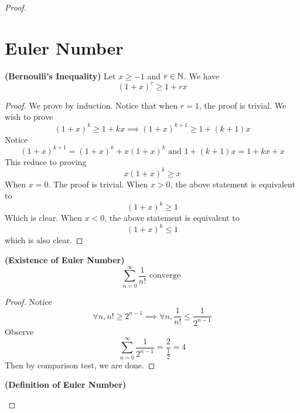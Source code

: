 \documentclass{report}
\begin{document}
\begin{proof}
\section{Euler Number}
\begin{lemma}
\label{2.4.1}
\textbf{(Bernoulli's Inequality)} 
Let $x\geq -1$ and $r\in\mathbb{N}$. We have
\begin{equation}
  (1+x)^r\geq 1+rx
\end{equation}
\end{lemma}
\begin{proof}
We prove by induction. Notice that when $r=1$, the proof is trivial. We wish to prove
\begin{equation}
  (1+x)^k \geq 1+kx\implies (1+x)^{k+1}\geq 1+(k+1)x
\end{equation}
Notice
\begin{equation}
  (1+x)^{k+1}=(1+x)^k +x(1+x)^k\text{ and }1+(k+1)x=1+kx+x
\end{equation}
This reduce to proving 
\begin{equation}
x(1+x)^k \geq x
\end{equation}
When $x=0$. The proof is trivial. When  $x>0$, the above statement is equivalent to 
 \begin{equation}
   (1+x)^k\geq 1
\end{equation}
Which is clear. When $x<0$, the above statement is equivalent to 
 \begin{equation}
   (1+x)^k\leq 1
\end{equation}
which is also clear.
\end{proof}
\begin{theorem}
\label{2.4.2}
\textbf{(Existence of Euler Number)} 
\begin{equation}
\sum_{n=0}^\infty \frac{1}{n!}\text{ converge }
\end{equation}
\end{theorem}
\begin{proof}
Notice 
\begin{equation}
\forall n, n!\geq 2^{n-1}\implies \forall n,\frac{1}{n!}\leq \frac{1}{2^{n-1}}
\end{equation}
Observe 
\begin{equation}
\sum_{n=0}^\infty  \frac{1}{2^{n-1}}=\frac{2}{\frac{1}{2}}=4
\end{equation}
Then by comparison test, we are done. 
\end{proof}
\begin{definition}
\label{2.4.3}
\textbf{(Definition of Euler Number)}
\begin{equation}

\end{equation}
\end{definition}
\end{proof}
\end{document}
